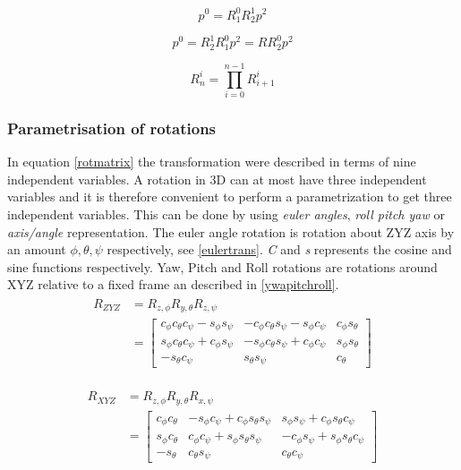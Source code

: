 \begin{equation}\label{rotationcomposition}
p^0 = R^0_1 R^1_2 p^2
\end{equation}

\begin{equation}\label{rotationcomposition_pre}
p^0 = R^1_2 R^0_1 p^2 = R R^0_2 p^2
\end{equation}

\begin{equation}\label{Rcompositioninf}
R^i_n = \prod_{i=0}^{n-1} R^i_{i+1}
\end{equation}


\subsubsection{Parametrisation of rotations}

In equation \eqref{rotmatrix} the transformation were described in terms of nine independent variables. A rotation in 3D can at most have three independent variables and it is therefore convenient to perform a parametrization to get three independent variables. This can be done by using \textit{euler angles}, \textit{roll pitch yaw} or \textit{axis/angle} representation. The euler angle rotation is rotation about ZYZ axis by an amount $\phi, \theta, \psi$ respectively, see \eqref{eulertrans}. \textit{C} and \textit{s} represents the cosine and sine functions respectively. Yaw, Pitch and Roll rotations are rotations around XYZ relative to a fixed frame an described in \eqref{ywapitchroll}.
\begin{align}\label{eulertrans}
\begin{split}
R_{ZYZ} &= R_{z,\phi}R_{y,\theta}R_{z,\psi} \\
&= \begin{bmatrix}
c_\phi c_\theta c_\psi - s_\phi s_\psi & -c_\phi c_\theta s_\psi - s_\phi c_\psi & c_\phi s_\theta\\ 
s_\phi c_\theta c_\psi + c_\phi s_\psi & -s_\phi c_\theta s_\psi + c_\phi c_\psi  & s_\phi s_\theta \\ 
-s_\theta c_\psi & s_\theta s_\psi & c_\theta
\end{bmatrix}
\end{split}
\end{align}


\begin{align}\label{ywapitchroll}
\begin{split}
R_{XYZ} &= R_{z,\phi}R_{y,\theta}R_{x,\psi} \\
&= \begin{bmatrix}
c_\phi c_\theta & - s_\phi c_\psi + c_\phi s_\theta s_\psi & s_\phi s_\psi + c_\phi s_\theta c_\psi \\ 
s_\phi c_\theta & c_\phi c_\psi + s_\phi s_\theta s_\psi  & - c_\phi s_\psi + s_\phi s_\theta c_\psi \\ 
-s_\theta & c_\theta s_\psi & c_\theta c_\psi
\end{bmatrix}
\end{split}
\end{align}

